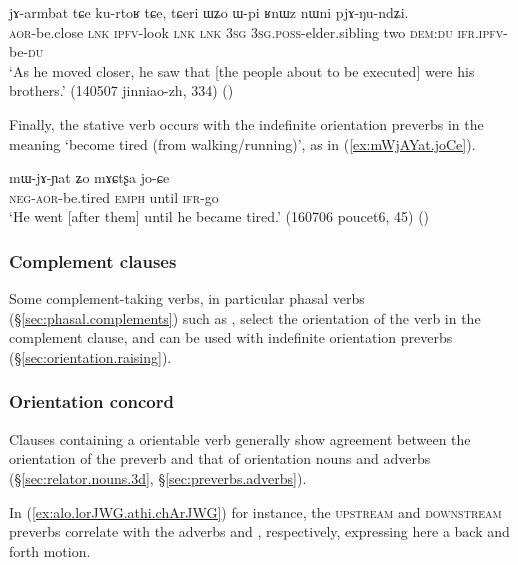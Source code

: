 \begin{exe}
\ex \label{ex:jarmbat.kurtoR}
\gll  jɤ-armbat tɕe ku-rtoʁ tɕe, tɕeri ɯʑo ɯ-pi ʁnɯz nɯni pjɤ-ŋu-ndʑi. \\
\textsc{aor}-be.close \textsc{lnk} \textsc{ipfv}-look \textsc{lnk} \textsc{lnk} \textsc{3sg} \textsc{3sg}.\textsc{poss}-elder.sibling two \textsc{dem}:\textsc{du} \textsc{ifr}.\textsc{ipfv}-be-\textsc{du} \\
\glt `As he moved closer, he saw that [the people about to be executed] were his brothers.' (140507 jinniao-zh, 334) ()
\end{exe}

Finally, the stative verb  occurs with the indefinite orientation preverbs in the meaning `become tired (from walking/running)', as in (\ref{ex:mWjAYat.joCe}).

\begin{exe}
\ex \label{ex:mWjAYat.joCe}
\gll mɯ-jɤ-ɲat ʑo mɤɕtʂa jo-ɕe \\
\textsc{neg}-\textsc{aor}-be.tired \textsc{emph} until \textsc{ifr}-go \\
\glt `He went [after them] until he became tired.' (160706 poucet6, 45) ()
\end{exe}

\subsubsection{Complement clauses} \label{sec:orientation.complement.clause}
Some complement-taking verbs, in particular phasal verbs (§\ref{sec:phasal.complements}) such as , select the orientation of the verb in the complement clause, and can be used with indefinite orientation preverbs (§\ref{sec:orientation.raising}). 

\subsubsection{Orientation concord} \label{sec:orientation.concord}
Clauses containing a orientable verb generally show agreement between the orientation of the preverb and that of orientation nouns and adverbs
(§\ref{sec:relator.nouns.3d}, §\ref{sec:preverbs.adverbs}). 

In (\ref{ex:alo.lorJWG.athi.chArJWG}) for instance, the \textsc{upstream}  and  \textsc{downstream} preverbs   correlate with the adverbs  and , respectively, expressing here a back and forth motion.

